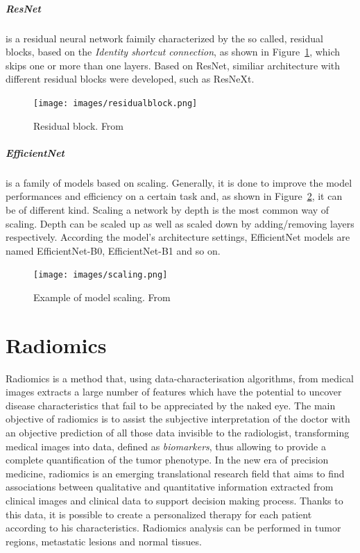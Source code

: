 \documentclass[12pt,a4paper]{report}
\begin{document}
\paragraph{ResNet} is a residual neural network faimily characterized by the so called, residual blocks, based on the \textit{Identity shortcut connection}, as shown in Figure~\ref{resnet}, which skips one or more than one layers\cite{resnet}. Based on ResNet, similiar architecture with different residual blocks were developed, such as ResNeXt.

\begin{figure}[h!]
	\centering
	\texttt{[image: images/residualblock.png]}
	\caption{Residual block. From \cite{resnet} }\label{resnet}
\end{figure}

\paragraph{EfficientNet} is a family of models based on scaling\cite{efficientnet}. Generally, it is done to improve the model performances and efficiency on a certain task and, as shown in Figure~\ref{efficientnet}, it can be of different kind. Scaling a network by depth is the most common way of scaling. Depth can be scaled up as well as scaled down by adding/removing layers respectively\cite{url:efficientnet}. According the model's architecture  settings, EfficientNet models are named EfficientNet-B0, EfficientNet-B1 and so on.

\begin{figure}[h!]
	\centering
	\texttt{[image: images/scaling.png]}
	\caption{Example of model scaling. From \cite{efficientnet} }\label{efficientnet}
\end{figure}


\chapter{Radiomics}

Radiomics is a method that, using data-characterisation algorithms, from  medical images extracts a large number of features which
have the potential to uncover disease characteristics that fail to be appreciated by the naked eye\cite{wiki:Radiomics}. The main objective of radiomics is to assist the subjective interpretation of the doctor with an objective prediction of all those data invisible to the radiologist, transforming medical images into data, defined as \textit{biomarkers}, thus allowing to provide a complete quantification of the tumor phenotype\cite{tesicoppola}. In the new era of precision medicine, radiomics is an emerging translational research field that aims to find associations between qualitative and quantitative information extracted from clinical images and clinical data to support decision making process. Thanks to this data, it is possible to create a personalized therapy for each patient according to his characteristics. Radiomics analysis can be performed in tumor regions, metastatic lesions and normal tissues\cite{tesicoppola}.
\end{document}
